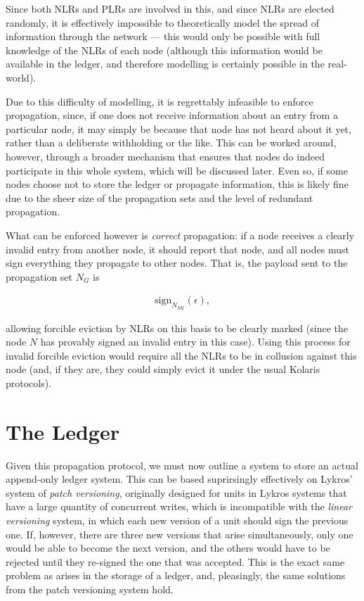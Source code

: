 \documentclass{extreport}
\begin{document}
Since both NLRs and PLRs are involved in this, and since NLRs are elected randomly, it is effectively impossible to theoretically model the spread of information through the network --- this would only be possible with full knowledge of the NLRs of each node (although this information would be available in the ledger, and therefore modelling is certainly possible in the real-world).

Due to this difficulty of modelling, it is regrettably infeasible to enforce propagation, since, if one does not receive information about an entry from a particular node, it may simply be because that node has not heard about it yet, rather than a deliberate withholding or the like. This can be worked around, however, through a broader mechanism that ensures that nodes do indeed participate in this whole system, which will be discussed later. Even so, if some nodes choose not to store the ledger or propagate information, this is likely fine due to the sheer size of the propagation sets and the level of redundant propagation.

What can be enforced however is \emph{correct} propagation: if a node receives a clearly invalid entry from another node, it should report that node, and all nodes must sign everything they propagate to other nodes. That is, the payload sent to the propagation set \(N_G\) is

\begin{align*}
\mathrm{sign}_{N_{SK}}(\epsilon), \tag{2.3}
\end{align*}

allowing forcible eviction by NLRs on this basis to be clearly marked (since the node \(N\) has provably signed an invalid entry in this case). Using this process for invalid forcible eviction would require all the NLRs to be in collusion against this node (and, if they are, they could simply evict it under the usual Kolaris protocols).

\chapter{The Ledger}
\label{sec:orge05d024}

Given this propagation protocol, we must now outline a system to store an actual append-only ledger system. This can be based suprirsingly effectively on Lykros' system of \emph{patch versioning}, originally designed for units in Lykros systems that have a large quantity of concurrent writes, which is incompatible with the \emph{linear versioning} system, in which each new version of a unit should sign the previous one. If, however, there are three new versions that arise simultaneously, only one would be able to become the next version, and the others would have to be rejected until they re-signed the one that was accepted. This is the exact same problem as arises in the storage of a ledger, and, pleasingly, the same solutions from the patch versioning system hold.
\end{document}
